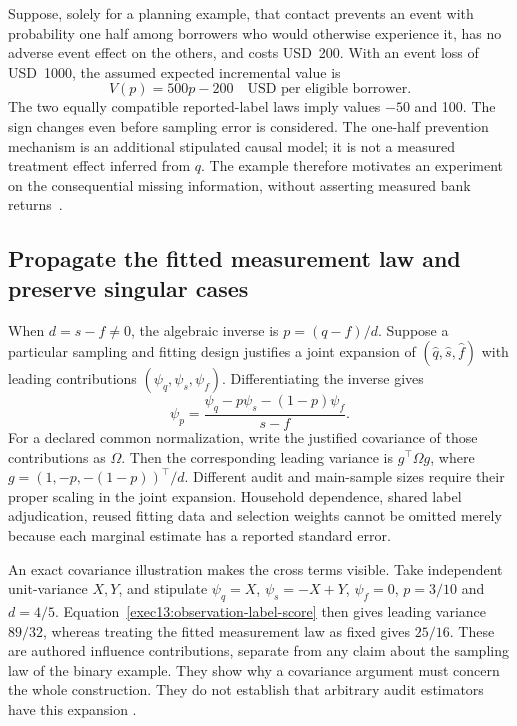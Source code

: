 Suppose, solely for a planning example, that contact prevents an event with
probability one half among borrowers who would otherwise experience it,
has no adverse event effect on the others, and costs USD~200. With an event
loss of USD~1000, the assumed expected incremental value is
\[
 V(p)=500p-200\quad\text{USD per eligible borrower}.
\]
The two equally compatible reported-label laws imply values $-50$ and
100. The sign changes even before sampling error is considered. The
one-half prevention mechanism is an additional stipulated causal model;
it is not a measured treatment effect inferred from $q$. The example
therefore motivates an experiment on the consequential missing information,
without asserting measured bank returns~\citep{exec13_observation_exact}.

\subsection{Propagate the fitted measurement law and preserve singular cases}

When $d=s-f\ne0$, the algebraic inverse is $p=(q-f)/d$. Suppose a
particular sampling and fitting design justifies a joint expansion of
$(\widehat q,\widehat s,\widehat f)$ with leading contributions
$(\psi_q,\psi_s,\psi_f)$. Differentiating the inverse gives
\begin{equation}
 \psi_p=\frac{\psi_q-p\psi_s-(1-p)\psi_f}{s-f}.
 \label{exec13:observation-label-score}
\end{equation}
For a declared common normalization, write the justified covariance of
those contributions as $\Omega$. Then the corresponding leading variance
is $g^\top\Omega g$, where
$g=(1,-p,-(1-p))^\top/d$. Different audit and main-sample sizes require
their proper scaling in the joint expansion. Household dependence, shared
label adjudication, reused fitting data and selection weights cannot be
omitted merely because each marginal estimate has a reported standard error.

An exact covariance illustration makes the cross terms visible. Take
independent unit-variance $X,Y$, and stipulate
$\psi_q=X$, $\psi_s=-X+Y$, $\psi_f=0$, $p=3/10$ and $d=4/5$.
Equation~\eqref{exec13:observation-label-score} then gives leading variance
$89/32$, whereas treating the fitted measurement law as fixed gives
$25/16$. These are authored influence contributions, separate from any
claim about the sampling law of the binary example. They show why a
covariance argument must concern the whole construction. They do not
establish that arbitrary audit estimators have this expansion
\citep{exec13_observation_exact}.

